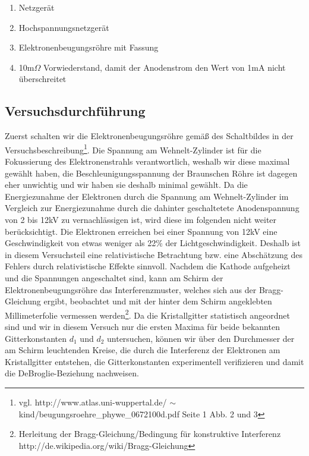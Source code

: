 \documentclass[12pt,a4paper]{article}
\begin{document}
\begin{enumerate}
\item	Netzgerät

\item	Hochspannungsnetzgerät

\item	Elektronenbeugungsröhre mit Fassung

\item	10m$\Omega$ Vorwiederstand, damit der Anodenstrom den Wert von 1mA nicht überschreitet
\end{enumerate}


\subsection{Versuchsdurchführung}
Zuerst schalten wir die Elektronenbeugungsröhre gemäß des Schaltbildes in der Versuchsbeschreibung\footnote{vgl. http://www.atlas.uni-wuppertal.de/
$\sim$kind/beugungsroehre\_phywe\_0672100d.pdf Seite 1 Abb. 2 und 3}. Die Spannung am Wehnelt-Zylinder ist für die Fokussierung des Elektronenstrahls verantwortlich, weshalb wir diese maximal gewählt haben, die Beschleunigungsspannung der Braunschen Röhre ist dagegen eher unwichtig und wir haben sie deshalb minimal gewählt. Da die Energiezunahme der Elektronen durch die Spannung am Wehnelt-Zylinder im Vergleich zur Energiezunahme durch die dahinter geschaltetete Anodenspannung von 2 bis 12kV zu vernachlässigen ist, wird diese im folgenden nicht weiter berücksichtigt. Die Elektronen erreichen bei einer Spannung von 12kV eine Geschwindigkeit von etwas weniger als 22\% der Lichtgeschwindigkeit. Deshalb ist in diesem Versuchsteil eine relativistische Betrachtung bzw. eine Abschätzung des Fehlers durch relativistische Effekte sinnvoll. Nachdem die Kathode aufgeheizt und die Spannungen angeschaltet sind, kann am Schirm der Elektronenbeugungsröhre das Interferenzmuster, welches sich aus der Bragg-Gleichung ergibt, beobachtet und mit der hinter dem Schirm angeklebten Millimeterfolie vermessen werden\footnote{Herleitung der Bragg-Gleichung/Bedingung für konstruktive Interferenz http://de.wikipedia.org/wiki/Bragg-Gleichung}.
Da die Kristallgitter statistisch angeordnet sind und wir in diesem Versuch nur die ersten Maxima für beide bekannten Gitterkonstanten $d_1$ und $d_2$ untersuchen, können wir über den Durchmesser der am Schirm leuchtenden Kreise, die durch die Interferenz der Elektronen am Kristallgitter entstehen, die Gitterkonstanten experimentell verifizieren und damit die DeBroglie-Beziehung nachweisen.
\end{document}
